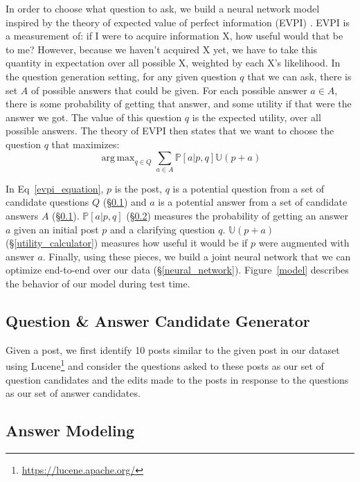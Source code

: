 \documentclass[11pt,a4paper]{article}
\DeclareMathOperator*{\argmax}{arg\,max}
\newcommand{\U}{\mathbb{U}}
\begin{document}
In order to choose what question to ask, we build a neural network model inspired by the theory of expected value of perfect information (EVPI) \cite{avriel1970value}. EVPI is a measurement of: if I were to acquire information X, how useful would that be to me? However, because we haven't acquired X yet, we have to take this quantity in expectation over all possible X, weighted by each X's likelihood. In the question generation setting, for any given question $q$ that we can ask, there is set $A$ of possible answers that could be given. For each possible answer $a \in A$, there is some probability of getting that answer, and some utility if that were the answer we got. The value of this question $q$ is the expected utility, over all possible answers. The theory of EVPI then states that we want to choose the question $q$ that maximizes:
\begin{equation}\label{evpi_equation}
\argmax_{q \in Q} \sum_{a \in A} \mathbb{P}[a | p,q] \U(p+a)
\end{equation} 

In Eq~\ref{evpi_equation}, $p$ is the post, $q$ is a potential question from a set of candidate questions $Q$ (\S\ref{question_candidate_generator}) and $a$ is a potential answer from a set of candidate answers $A$ (\S\ref{question_candidate_generator}). $\mathbb{P}[a | p,q]$ (\S\ref{answer_modeling}) measures the probability of getting an answer $a$ given an initial post $p$ and a clarifying question $q$. $\U(p+a)$ (\S\ref{utility_calculator}) measures how useful it would be if $p$ were augmented with answer $a$. Finally, using these pieces, we build a joint neural network that we can optimize end-to-end over our data (\S\ref{neural_network}). Figure~\ref{model} describes the behavior of our model during test time. 

\subsection{Question \& Answer Candidate Generator}\label{question_candidate_generator}

Given a post, we first identify 10 posts similar to the given post in our dataset using Lucene\footnote{\url{https://lucene.apache.org/}} and consider the questions asked to these posts as our set of question candidates and the edits made to the posts in response to the questions as our set of answer candidates.

\subsection{Answer Modeling}\label{answer_modeling}
\end{document}
